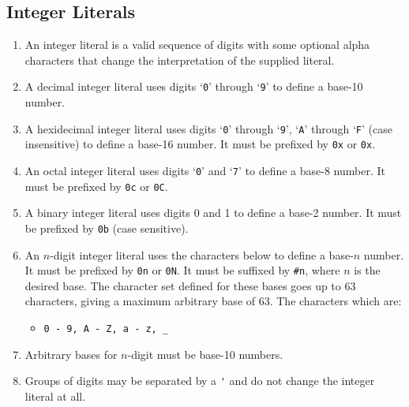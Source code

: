 \subsection{Integer Literals}\label{ssec: Integer Literals}
\begin{enumerate}
	\item An integer literal is a valid sequence of digits with some optional alpha characters that change the interpretation of the supplied literal.
	\item A decimal integer literal uses digits `\lstinline|0|' through `\lstinline|9|' to define a base-10 number.
	\item A hexidecimal integer literal uses digits `\lstinline|0|' through `\lstinline|9|', `\lstinline|A|' through `\lstinline|F|' (case insensitive) to define a base-16 number. It must be prefixed by \lstinline|0x| or \lstinline|0x|.
	\item An octal integer literal uses digits `\lstinline|0|' and `\lstinline|7|' to define a base-8 number. It must be prefixed by \lstinline|0c| or \lstinline|0C|.
	\item A binary integer literal uses digits 0 and 1 to define a base-2 number. It must be prefixed by \lstinline|0b| (case sensitive).
	\item An $n$-digit integer literal uses the characters below to define a base-$n$ number. It must be prefixed by \lstinline|0n| or \lstinline|0N|. It must be suffixed by \lstinline|#n|, where $n$ is the desired base. The character set defined for these bases goes up to 63 characters, giving a maximum arbitrary base of 63. The characters which are: 
	\begin{itemize}
		\item[] \lstinline|0 - 9, A - Z, a - z, _|
	\end{itemize}
	\item Arbitrary bases for $n$-digit must be base-10 numbers.
	\item Groups of digits may be separated by a \lstinline|'| and do not change the integer literal at all.
\end{enumerate}


